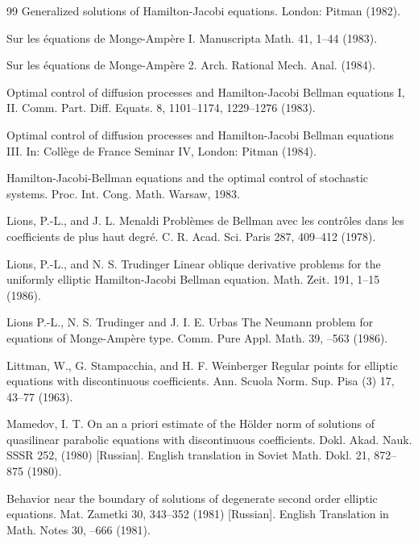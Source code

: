 \begin{thebibliography}{99}
\newblock Generalized solutions of Hamilton-Jacobi equations. London: Pitman (1982).

\newblock Sur les équations de Monge-Ampère I. Manuscripta Math. 41, 1--44 (1983).

\newblock Sur les équations de Monge-Ampère 2. Arch. Rational Mech. Anal. (1984).

\newblock Optimal control of diffusion processes and Hamilton-Jacobi Bellman equations I, II.
\newblock Comm. Part. Diff. Equats. 8, 1101--1174, 1229--1276 (1983).

\newblock Optimal control of diffusion processes and Hamilton-Jacobi Bellman equations III. In:
\newblock Collège de France Seminar IV, London: Pitman (1984).

\newblock Hamilton-Jacobi-Bellman equations and the optimal control of stochastic systems. Proc.
\newblock Int. Cong. Math. Warsaw, 1983.

Lions, P.-L., and J. L. Menaldi
\newblock Problèmes de Bellman avec les contrôles dans les coefficients de plus haut degré. C. R. Acad.
\newblock Sci. Paris 287, 409--412 (1978).

Lions, P.-L., and N. S. Trudinger
\newblock Linear oblique derivative problems for the uniformly elliptic Hamilton-Jacobi Bellman
\newblock equation. Math. Zeit. 191, 1--15 (1986).

Lions P.-L., N. S. Trudinger and J. I. E. Urbas
\newblock The Neumann problem for equations of Monge-Ampère type. Comm. Pure Appl. Math. 39,
--563 (1986).

Littman, W., G. Stampacchia, and H. F. Weinberger
\newblock Regular points for elliptic equations with discontinuous coefficients. Ann. Scuola Norm.
\newblock Sup. Pisa (3) 17, 43--77 (1963).

Mamedov, I. T.
\newblock On an a priori estimate of the Hölder norm of solutions of quasilinear parabolic equations
\newblock with discontinuous coefficients. Dokl. Akad. Nauk. SSSR 252, (1980) [Russian]. English
\newblock translation in Soviet Math. Dokl. 21, 872--875 (1980).

\newblock Behavior near the boundary of solutions of degenerate second order elliptic equations.
\newblock Mat. Zametki 30, 343--352 (1981) [Russian]. English Translation in Math. Notes 30,
--666 (1981).

\end{thebibliography}

